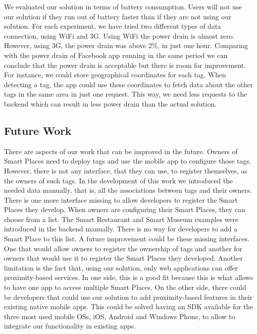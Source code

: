 We evaluated our solution in terms of battery consumption.
Users will not use our solution if they run out of battery faster than if they are not using our solution.
For each experiment, we have tried two different types of data connection, using \gls{WiFi} and \gls{3G}.
Using \gls{WiFi} the power drain is almost zero.
However, using \gls{3G}, the power drain was above 2\%, in just one hour.
Comparing with the power drain of Facebook app running in the same period we can conclude that the power drain is acceptable but there is room for improvement.
For instance, we could store geographical coordinates for each tag.
When detecting a tag, the app could use these coordinates to fetch data about the other tags in the same area in just one request.
This way, we need less requests to the backend which can result in less power drain than the actual solution.

\subsection{Future Work}
\label{sub:conclusion_future_work}

There are aspects of our work that can be improved in the future.
Owners of Smart Places need to deploy tags and use the mobile app to configure those tags.
However, there is not any interface, that they can use, to register themselves, as the owners of such tags.
In the development of this work we introduced the needed data manually, that is,
all the associations between tags and their owners.
There is one more interface missing to allow developers to register the Smart Places they develop.
When owners are configuring their Smart Places, they can choose from a list.
The Smart Restaurant and Smart Museum examples were introduced in the backend manually.
There is no way for developers to add a Smart Place to this list.
A future improvement could be these missing interfaces.
One that would allow owners to register the ownership of tags and another for owners that would use it to register the Smart Places they developed.
Another limitation is the fact that, using our solution, only web applications can offer proximity-based services.
In one side, this is a good fit because this is what allows to have one app to access multiple Smart Places.
On the other side, there could be developers that could use our solution to add proximity-based features in their existing native mobile apps.
This could be solved having an \gls{SDK} available for the three most used mobile \glspl{OS}, iOS, Android and Windows Phone, to allow to integrate our functionality in existing apps.

